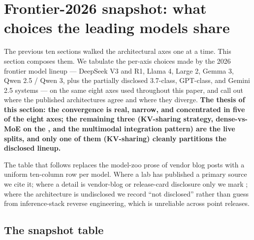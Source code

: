 
\section{Frontier-2026 snapshot: what choices the leading models share}
\label{sec:frontier-snapshot}

The previous ten sections walked the architectural axes one at a
time. This section composes them. We tabulate the per-axis choices
made by the 2026 frontier model lineup --- DeepSeek V3 and R1, Llama
4,  Large 2, Gemma 3, Qwen 2.5 / Qwen 3, plus the partially
disclosed  3.7-class, GPT-class, and Gemini 2.5 systems --- on
the same eight axes used throughout this paper, and call out where
the published architectures agree and where they diverge.
\textbf{The thesis of this section: the convergence is real, narrow,
and concentrated in five of the eight axes; the remaining three
(KV-sharing strategy, dense-vs-MoE on the , and the multimodal
integration pattern) are the live splits, and only one of them
(KV-sharing) cleanly partitions the disclosed lineup.}

The table that follows replaces the model-zoo prose of vendor blog
posts with a uniform ten-column row per model. Where a lab has
published a primary source we cite it; where a detail is vendor-blog
or release-card disclosure only we mark
; where the architecture is undisclosed
we record ``not disclosed'' rather than guess from inference-stack
reverse engineering, which is unreliable across point releases.

\subsection{The snapshot table}
\label{sec:snapshot-table}

